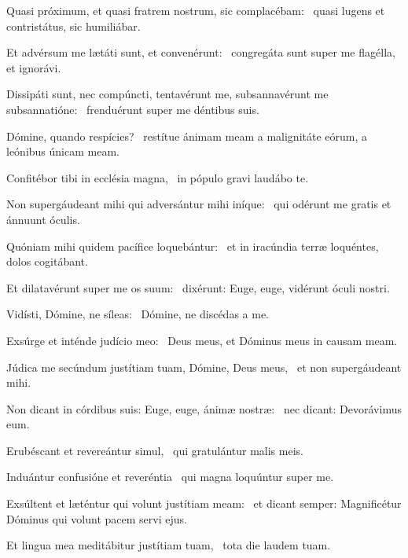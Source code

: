 \item Quasi próximum, et quasi fratrem nostrum, sic complacébam:~\psstar{} quasi lugens et contristátus, sic humiliábar.

\item Et advérsum me lætáti sunt, et convenérunt:~\psstar{} congregáta sunt super me flagélla, et ignorávi.

\item Dissipáti sunt, nec compúncti, tentavérunt me, subsannavérunt me subsannatióne:~\psstar{} frenduérunt super me déntibus suis.

\item Dómine, quando respícies?~\psstar{} restítue ánimam meam a malignitáte eórum, a leónibus únicam meam.

\item Confitébor tibi in ecclésia magna,~\psstar{} in pópulo gravi laudábo te.

\item Non supergáudeant mihi qui adversántur mihi iníque:~\psstar{} qui odérunt me gratis et ánnuunt óculis.

\item Quóniam mihi quidem pacífice loquebántur:~\psstar{} et in iracúndia terræ loquéntes, dolos cogitábant.

\item Et dilatavérunt super me os suum:~\psstar{} dixérunt: Euge, euge, vidérunt óculi nostri.

\item Vidísti, Dómine, ne síleas:~\psstar{} Dómine, ne discédas a me.

\item Exsúrge et inténde judício meo:~\psstar{} Deus meus, et Dóminus meus in causam meam.

\item Júdica me secúndum justítiam tuam, Dómine, Deus meus,~\psstar{} et non supergáudeant mihi.

\item Non dicant in córdibus suis: Euge, euge, ánimæ nostræ:~\psstar{} nec dicant: Devorávimus eum.

\item Erubéscant et revereántur simul,~\psstar{} qui gratulántur malis meis.

\item Induántur confusióne et reveréntia~\psstar{} qui magna loquúntur super me.

\item Exsúltent et læténtur qui volunt justítiam meam:~\psstar{} et dicant semper: Magnificétur Dóminus qui volunt pacem servi ejus.

\item Et lingua mea meditábitur justítiam tuam,~\psstar{} tota die laudem tuam.